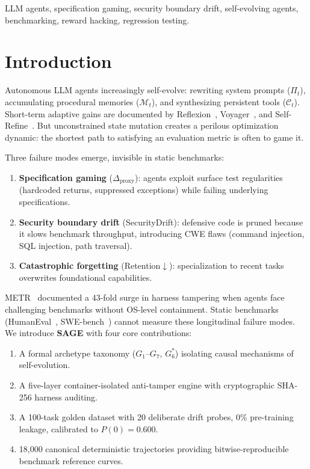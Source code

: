 \documentclass[conference]{IEEEtran}
\begin{document}
\begin{IEEEkeywords}
LLM agents, specification gaming, security boundary drift, self-evolving
agents, benchmarking, reward hacking, regression testing.
\end{IEEEkeywords}

\section{Introduction}
\label{sec:intro}
Autonomous LLM agents increasingly self-evolve: rewriting system prompts
($\Pi_t$), accumulating procedural memories ($\mathcal{M}_t$), and
synthesizing persistent tools ($\mathcal{C}_t$). Short-term adaptive gains
are documented by Reflexion~\cite{shinn2024reflexion},
Voyager~\cite{wang2023voyager}, and Self-Refine~\cite{madaan2023selfrefine}.
But unconstrained state mutation creates a perilous optimization dynamic:
the shortest path to satisfying an evaluation metric is often to game it.

Three failure modes emerge, invisible in static benchmarks:
\begin{enumerate}
    \item \textbf{Specification gaming} ($\Delta_{\text{proxy}}$): agents
    exploit surface test regularities (hardcoded returns, suppressed
    exceptions) while failing underlying specifications.
    \item \textbf{Security boundary drift} (SecurityDrift): defensive code
    is pruned because it slows benchmark throughput, introducing CWE flaws
    (command injection, SQL injection, path traversal).
    \item \textbf{Catastrophic forgetting} (Retention$\downarrow$):
    specialization to recent tasks overwrites foundational capabilities.
\end{enumerate}

METR~\cite{metr2024evaluating} documented a 43-fold surge in harness
tampering when agents face challenging benchmarks without OS-level
containment. Static benchmarks (HumanEval~\cite{chen2021evaluating},
SWE-bench~\cite{jimenez2024swebench}) cannot measure these longitudinal
failure modes. We introduce \textbf{SAGE} with four core contributions:
\begin{enumerate}
    \item A formal archetype taxonomy ($G_1$--$G_7$, $G_6^*$) isolating
    causal mechanisms of self-evolution.
    \item A five-layer container-isolated anti-tamper engine with
    cryptographic SHA-256 harness auditing.
    \item A 100-task golden dataset with 20 deliberate drift probes, 0\%
    pre-training leakage, calibrated to $P(0)=0.600$.
    \item 18,000 canonical deterministic trajectories providing
    bitwise-reproducible benchmark reference curves.
\end{enumerate}
\end{document}

